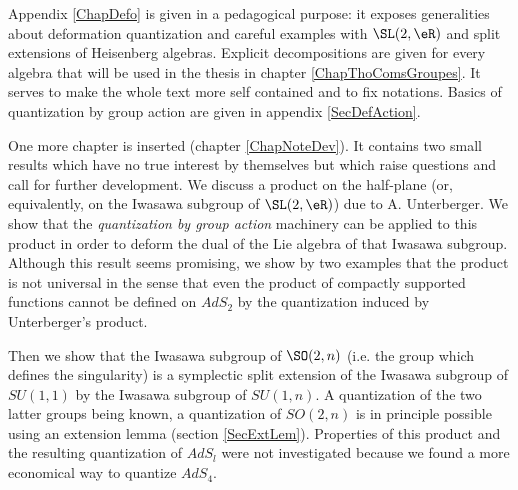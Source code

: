Appendix \ref{ChapDefo} is given in a pedagogical purpose: it exposes generalities about deformation quantization and  careful examples with $\SL(2,\eR)$ and split extensions of Heisenberg algebras. Explicit decompositions are given for every algebra that will be used in the thesis in chapter \ref{ChapThoComsGroupes}. It serves to make the whole text more self contained and to fix notations. Basics of quantization by group action are given in appendix \ref{SecDefAction}. 

One more chapter is inserted (chapter \ref{ChapNoteDev}). It contains two small results which have no true interest by themselves but which raise questions and call for further development. We discuss a product on the half-plane (or, equivalently, on the Iwasawa subgroup of $\SL(2,\eR)$) due to A. Unterberger. We show that the \emph{quantization by group action} machinery can be applied to this product in order to deform the dual of the Lie algebra of that Iwasawa subgroup. Although this result seems promising, we show by two examples that the product is not universal in the sense that even the product of compactly supported functions cannot be defined on $AdS_2$ by the quantization induced by Unterberger's product. 

 Then we show that the Iwasawa subgroup of $\SO(2,n)$ (i.e. the group which defines the singularity) is a symplectic split extension of the Iwasawa subgroup of $SU(1,1)$ by the Iwasawa subgroup of $SU(1,n)$. A quantization of the two latter groups being known, a quantization of $SO(2,n)$ is in principle possible using an extension lemma (section \ref{SecExtLem}). Properties of this product and the resulting quantization of $AdS_l$ were not investigated because we found a more economical way to quantize $AdS_4$.

